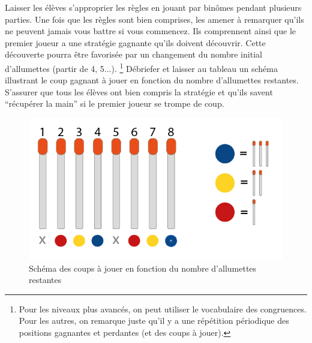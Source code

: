 \documentclass[a4paper,12pt]{article}
\begin{document}
\noindent Laisser les élèves s'approprier les règles en jouant par binômes pendant plusieurs parties. Une fois que les règles sont bien comprises, les amener à remarquer qu'ils ne peuvent jamais vous battre si vous commencez. Ils comprennent ainsi que le premier joueur a une stratégie gagnante qu'ils doivent découvrir. Cette découverte pourra être favorisée par un changement du nombre initial d'allumettes (partir de 4, 5...).  \footnote{Pour les niveaux plus avancés, on peut utiliser le vocabulaire des congruences. Pour les autres, on remarque juste qu'il y a une répétition périodique des positions gagnantes et perdantes (et des coups à jouer).}
%
Débriefer et laisser au tableau un schéma illustrant le coup gagnant à jouer en fonction du nombre d'allumettes restantes. S'assurer que tous les élèves ont bien compris la stratégie et qu'ils savent ``récupérer la main'' si le premier joueur se trompe de coup.

\begin{figure}[h!]
\centering
\includegraphics[scale = 0.4]{./Images/fig2-v3.png}
\caption{Schéma des coups à jouer en fonction du nombre d'allumettes restantes}
\label{fig:schemStrategie}
\end{figure}
\end{document}
